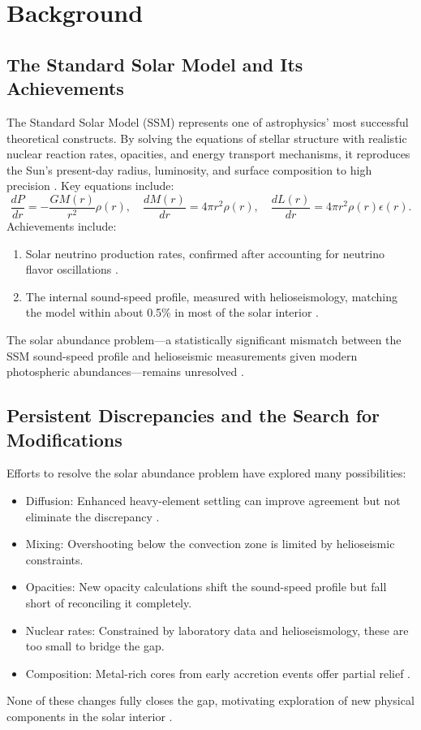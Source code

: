 \documentclass{article}
\begin{document}
\section{Background}

\subsection{The Standard Solar Model and Its Achievements}

The Standard Solar Model (SSM) represents one of astrophysics’ most successful theoretical constructs. By solving the equations of stellar structure with realistic nuclear reaction rates, opacities, and energy transport mechanisms, it reproduces the Sun’s present-day radius, luminosity, and surface composition to high precision \citep{eddington1920, gamow1938, schwarzschild1946, bahcall1972}. Key equations include:
\[
\frac{dP}{dr} = -\frac{G M(r)}{r^2} \rho(r), \quad \frac{dM(r)}{dr} = 4\pi r^2 \rho(r), \quad \frac{dL(r)}{dr} = 4\pi r^2 \rho(r) \epsilon(r).
\]
Achievements include:
\begin{enumerate}
\item Solar neutrino production rates, confirmed after accounting for neutrino flavor oscillations \citep{bahcall1972, ahmad2002}.
\item The internal sound-speed profile, measured with helioseismology, matching the model within about 0.5\% in most of the solar interior \citep{christensen-dalsgaard1976, christensen-dalsgaard2021}.
\end{enumerate}
The solar abundance problem---a statistically significant mismatch between the SSM sound-speed profile and helioseismic measurements given modern photospheric abundances---remains unresolved \citep{buldgen2023}.

\subsection{Persistent Discrepancies and the Search for Modifications}

Efforts to resolve the solar abundance problem have explored many possibilities:
\begin{itemize}
\item Diffusion: Enhanced heavy-element settling can improve agreement but not eliminate the discrepancy \citep{christensen-dalsgaard1993}.
\item Mixing: Overshooting below the convection zone is limited by helioseismic constraints.
\item Opacities: New opacity calculations shift the sound-speed profile but fall short of reconciling it completely.
\item Nuclear rates: Constrained by laboratory data and helioseismology, these are too small to bridge the gap.
\item Composition: Metal-rich cores from early accretion events offer partial relief \citep{bellinger2022}.
\end{itemize}
None of these changes fully closes the gap, motivating exploration of new physical components in the solar interior \citep{buldgen2023}.
\end{document}
